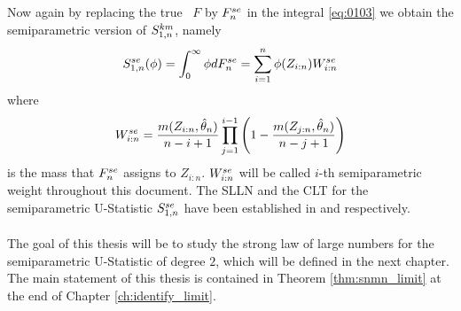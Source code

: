Now again by replacing the true \df\ $F$ by $F_n^{se}$ in the integral \eqref{eq:0103} we obtain the semiparametric version of $S_{1,n}^{km}$, namely
$$S_{1,n}^{se}(\phi)=\int_0^\infty \phi dF_n^{se} = \sum\limits_{i=1}^n \phi(Z_{i:n})W_{i:n}^{se}$$
where 
$$W_{i:n}^{se} = \frac{m(Z_{i:n}, \hat{\theta}_n)}{n-i+1} \prod\limits_{j=1}^{i-1}\left(1-\frac{m(Z_{j:n}, \hat{\theta}_n)}{n-j+1}\right)$$
is the mass that $F_n^{se}$ assigns to $Z_{i:n}$. $W_{i:n}^{se}$ will be called $i$-th semiparametric weight throughout this document. The SLLN and the CLT for the semiparametric U-Statistic $S_{1,n}^{se}$ have been established in \citet{dikta2000strong} and \citet{dikta2005central} respectively.\\
\\
The goal of this thesis will be to study the strong law of large numbers for the semiparametric U-Statistic of degree $2$, which will be defined in the next chapter. The main statement of this thesis is contained in Theorem \ref{thm:snmn_limit} at the end of Chapter \ref{ch:identify_limit}.\\
\\
%
